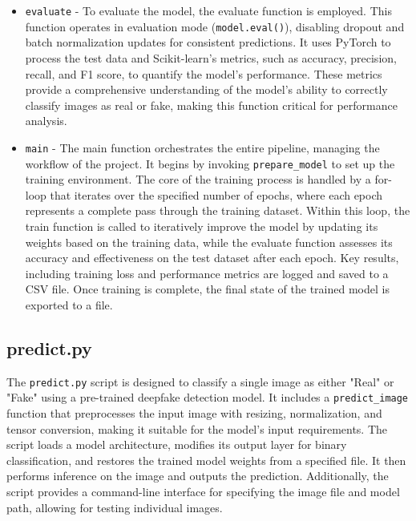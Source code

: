 \documentclass[conference]{IEEEtran}
\begin{document}
\begin{itemize}
        \item \texttt{evaluate} - To evaluate the model, the evaluate function is employed. This function operates in evaluation mode (\texttt{model.eval()}), disabling dropout and batch normalization updates for consistent predictions. It uses PyTorch to process the test data and Scikit-learn’s metrics, such as accuracy, precision, recall, and F1 score, to quantify the model’s performance. These metrics provide a comprehensive understanding of the model’s ability to correctly classify images as real or fake, making this function critical for performance analysis. \\
        \item \texttt{main} - The main function orchestrates the entire pipeline, managing the workflow of the project. It begins by invoking \texttt{prepare\_model} to set up the training environment. The core of the training process is handled by a for-loop that iterates over the specified number of epochs, where each epoch represents a complete pass through the training dataset. Within this loop, the train function is called to iteratively improve the model by updating its weights based on the training data, while the evaluate function assesses its accuracy and effectiveness on the test dataset after each epoch. Key results, including training loss and performance metrics are logged and saved to a CSV file. Once training is complete, the final state of the trained model is exported to a file.

    \end{itemize}
    
    \subsection*{predict.py}
    The \texttt{predict.py} script is designed to classify a single image as either "Real" or "Fake" using a pre-trained deepfake detection model. It includes a \texttt{predict\_image} function that preprocesses the input image with resizing, normalization, and tensor conversion, making it suitable for the model's input requirements. The script loads a model architecture, modifies its output layer for binary classification, and restores the trained model weights from a specified file. It then performs inference on the image and outputs the prediction. Additionally, the script provides a command-line interface for specifying the image file and model path, allowing for testing individual images.
\end{document}
